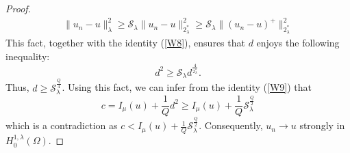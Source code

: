 \documentclass[10pt,a4paper]{amsart}
\begin{document}
\begin{proof}
\begin{align}
    \|u_n-u\|_\lambda^2\geq \mathcal{S}_\lambda\|u_n-u\|^2_{2^*_\lambda}\geq \mathcal{S}_\lambda\|(u_n-u)^+\|^2_{2^*_\lambda}
\end{align}
This fact, together with the identity (\ref{W8}), ensures that $d$ enjoys the following inequality:
$$d^2\geq \mathcal{S}_\lambda d^\frac{4}{2^*_\lambda}.$$
Thus, $d\geq \mathcal{S}_\lambda^\frac{Q}{4}$. Using this fact, we can infer from the identity (\ref{W9}) that $$c=I_\mu(u)+\frac{1}{Q}d^2\geq I_\mu(u)+\frac{1}{Q}\mathcal{S}_\lambda^\frac{Q}{2}$$
which is a contradiction as $c<I_\mu(u)+\frac{1}{Q}\mathcal{S}_\lambda^\frac{Q}{2}$. Consequently, $u_n\to u$ strongly in $H^{1,\lambda}_0(\Omega)$.
\end{proof}
\end{document}
